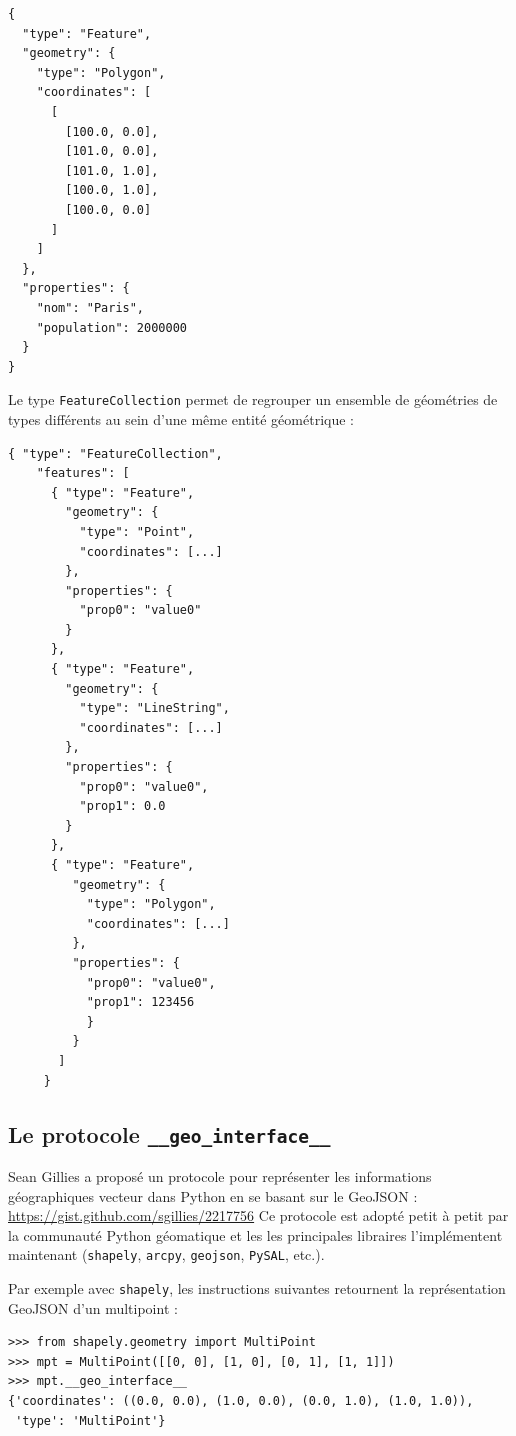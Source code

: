 \documentclass[11pt]{article}
\newcommand{\passthrough}[1]{#1}
\begin{document}
\begin{lstlisting}
{
  "type": "Feature",
  "geometry": {
    "type": "Polygon",
    "coordinates": [
      [
        [100.0, 0.0],
        [101.0, 0.0],
        [101.0, 1.0],
        [100.0, 1.0],
        [100.0, 0.0]
      ]
    ]
  },
  "properties": {
    "nom": "Paris",
    "population": 2000000
  }
}
\end{lstlisting}

Le type \passthrough{\lstinline!FeatureCollection!} permet de regrouper
un ensemble de géométries de types différents au sein d'une même entité
géométrique :

\begin{lstlisting}
{ "type": "FeatureCollection",
    "features": [
      { "type": "Feature",
        "geometry": {
          "type": "Point",
          "coordinates": [...]
        },
        "properties": {
          "prop0": "value0"
        }
      },
      { "type": "Feature",
        "geometry": {
          "type": "LineString",
          "coordinates": [...]
        },
        "properties": {
          "prop0": "value0",
          "prop1": 0.0
        }
      },
      { "type": "Feature",
         "geometry": {
           "type": "Polygon",
           "coordinates": [...]
         },
         "properties": {
           "prop0": "value0",
           "prop1": 123456
           }
         }
       ]
     }
\end{lstlisting}

\hypertarget{le-protocole-__geo_interface__}{%
\subsection{\texorpdfstring{Le protocole
\texttt{\_\_geo\_interface\_\_}}{Le protocole \_\_geo\_interface\_\_}}\label{le-protocole-__geo_interface__}}

Sean Gillies a proposé un protocole pour représenter les informations
géographiques vecteur dans Python en se basant sur le GeoJSON :
\url{https://gist.github.com/sgillies/2217756} Ce protocole est adopté
petit à petit par la communauté Python géomatique et les les principales
libraires l'implémentent maintenant (\passthrough{\lstinline!shapely!},
\passthrough{\lstinline!arcpy!}, \passthrough{\lstinline!geojson!},
\passthrough{\lstinline!PySAL!}, etc.).

Par exemple avec \passthrough{\lstinline!shapely!}, les instructions
suivantes retournent la représentation GeoJSON d'un multipoint :

\begin{lstlisting}
>>> from shapely.geometry import MultiPoint
>>> mpt = MultiPoint([[0, 0], [1, 0], [0, 1], [1, 1]])
>>> mpt.__geo_interface__
{'coordinates': ((0.0, 0.0), (1.0, 0.0), (0.0, 1.0), (1.0, 1.0)),
 'type': 'MultiPoint'}
\end{lstlisting}
\end{document}
